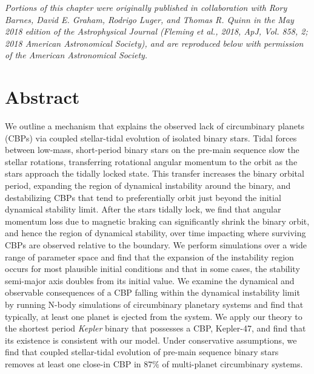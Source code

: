 \textit{Portions of this chapter were originally published in collaboration with Rory Barnes, David E. Graham, Rodrigo Luger, and Thomas R. Quinn in the May 2018 edition of the Astrophysical Journal (Fleming et al., 2018, ApJ, Vol. 858, 2; 2018 \textcopyright American Astronomical Society), and are reproduced below with permission of the American Astronomical Society.}

\section{Abstract}


We outline a mechanism that explains the observed lack of circumbinary planets (CBPs) via coupled stellar-tidal evolution of isolated binary stars.  Tidal forces between low-mass, short-period binary stars on the pre-main sequence slow the stellar rotations, transferring rotational angular momentum to the orbit as the stars approach the tidally locked state.  This transfer increases the binary orbital period, expanding the region of dynamical instability around the binary, and destabilizing CBPs that tend to preferentially orbit just beyond the initial dynamical stability limit.  After the stars tidally lock, we find that angular momentum loss due to magnetic braking can significantly shrink the binary orbit, and hence the region of dynamical stability, over time impacting where surviving CBPs are observed relative to the boundary.  We perform simulations over a wide range of parameter space and find that the expansion of the instability region occurs for most plausible initial conditions and that in some cases, the stability semi-major axis doubles from its initial value.  We examine the dynamical and observable consequences of a CBP falling within the dynamical instability limit by running N-body simulations of circumbinary planetary systems and find that typically, at least one planet is ejected from the system.  We apply our theory to the shortest period {\it Kepler} binary that possesses a CBP, Kepler-47, and find that its existence is consistent with our model.  Under conservative assumptions, we find that coupled stellar-tidal evolution of pre-main sequence binary stars removes at least one close-in CBP in $87\%$ of multi-planet circumbinary systems.

